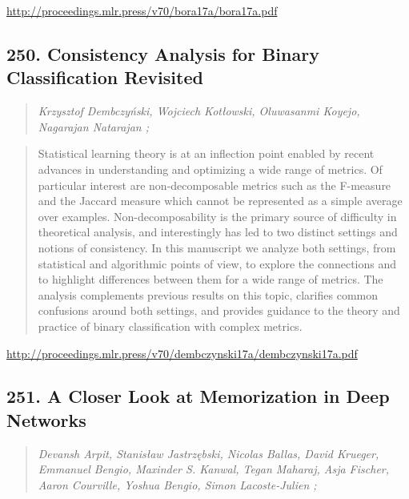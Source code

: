 \documentclass{article}
\begin{document}
\href{http://proceedings.mlr.press/v70/bora17a/bora17a.pdf}{http://proceedings.mlr.press/v70/bora17a/bora17a.pdf}

\subsection{250. Consistency Analysis for Binary Classification Revisited}

\begin{quote}
\footnotesize{\textit{Krzysztof Dembczyński, Wojciech Kotłowski, Oluwasanmi Koyejo, Nagarajan Natarajan ;}}

\end{quote}

\begin{quote}
    Statistical learning theory is at an inflection point enabled by recent advances in understanding and optimizing a wide range of metrics. Of particular interest are non-decomposable metrics such as the F-measure and the Jaccard measure which cannot be represented as a simple average over examples. Non-decomposability is the primary source of difficulty in theoretical analysis, and interestingly has led to two distinct settings and notions of consistency. In this manuscript we analyze both settings, from statistical and algorithmic points of view, to explore the connections and to highlight differences between them for a wide range of metrics. The analysis complements previous results on this topic, clarifies common confusions around both settings, and provides guidance to the theory and practice of binary classification with complex metrics.  
\end{quote}

\href{http://proceedings.mlr.press/v70/dembczynski17a/dembczynski17a.pdf}{http://proceedings.mlr.press/v70/dembczynski17a/dembczynski17a.pdf}

\subsection{251. A Closer Look at Memorization in Deep Networks}

\begin{quote}
\footnotesize{\textit{Devansh Arpit, Stanisław Jastrzębski, Nicolas Ballas, David Krueger, Emmanuel Bengio, Maxinder S. Kanwal, Tegan Maharaj, Asja Fischer, Aaron Courville, Yoshua Bengio, Simon Lacoste-Julien ;}}

\end{quote}
\end{document}
